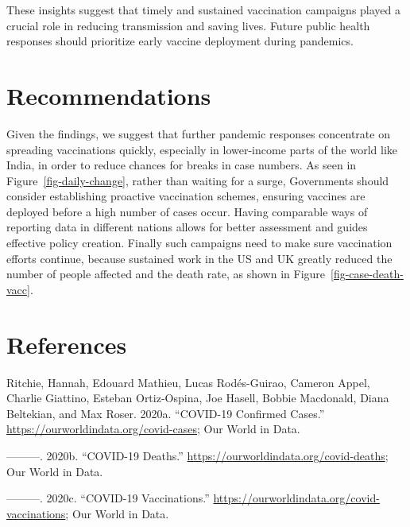 \documentclass[
  11pt,
]{article}
\newlength{\cslhangindent}
\newenvironment{CSLReferences}[2] %
 {\begin{list}{}{%
  \setlength{\itemindent}{0pt}
  \setlength{\leftmargin}{0pt}
  \setlength{\parsep}{0pt}
  \ifodd #1
   \setlength{\leftmargin}{\cslhangindent}
   \setlength{\itemindent}{-1\cslhangindent}
  \fi
  \setlength{\itemsep}{#2\baselineskip}}}
 {\end{list}}
\begin{document}
These insights suggest that timely and sustained vaccination campaigns
played a crucial role in reducing transmission and saving lives. Future
public health responses should prioritize early vaccine deployment
during pandemics.

\section{Recommendations}\label{sec-recommendations}

Given the findings, we suggest that further pandemic responses
concentrate on spreading vaccinations quickly, especially in
lower-income parts of the world like India, in order to reduce chances
for breaks in case numbers. As seen in Figure~\ref{fig-daily-change},
rather than waiting for a surge, Governments should consider
establishing proactive vaccination schemes, ensuring vaccines are
deployed before a high number of cases occur. Having comparable ways of
reporting data in different nations allows for better assessment and
guides effective policy creation. Finally such campaigns need to make
sure vaccination efforts continue, because sustained work in the US and
UK greatly reduced the number of people affected and the death rate, as
shown in Figure~\ref{fig-case-death-vacc}.

\section{References}\label{sec-references}

\label{refs}
\begin{CSLReferences}{1}{0}
Ritchie, Hannah, Edouard Mathieu, Lucas Rodés-Guirao, Cameron Appel,
Charlie Giattino, Esteban Ortiz-Ospina, Joe Hasell, Bobbie Macdonald,
Diana Beltekian, and Max Roser. 2020a. {``COVID-19 Confirmed Cases.''}
\url{https://ourworldindata.org/covid-cases}; Our World in Data.

---------. 2020b. {``COVID-19 Deaths.''}
\url{https://ourworldindata.org/covid-deaths}; Our World in Data.

---------. 2020c. {``COVID-19 Vaccinations.''}
\url{https://ourworldindata.org/covid-vaccinations}; Our World in Data.

\end{CSLReferences}
\end{document}
